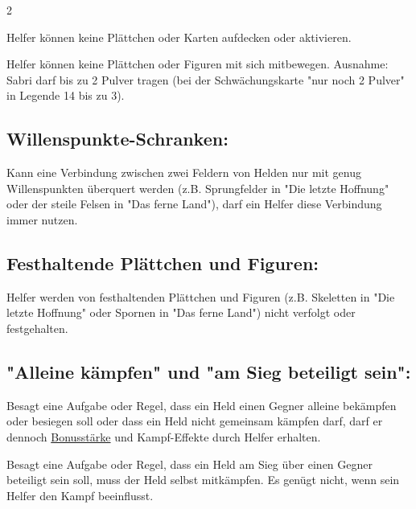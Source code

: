 \documentclass[10pt, a4paper, oneside]{book}
\begin{document}
\begin{multicols*}{2}
\begin{nobgcolor}
Helfer können keine Plättchen oder Karten aufdecken oder aktivieren.
\supercite{nh-begleitheft,dlh17-hoffnungskarte-zwerg,dh-begleitheft,mh-begleitheft}

Helfer können keine Plättchen oder Figuren mit sich mitbewegen.
\supercite{nh-begleitheft,dlh17-hoffnungskarte-zwerg,dh-begleitheft,mh-begleitheft}
Ausnahme: Sabri darf bis zu 2 Pulver tragen (bei der Schwächungskarte "nur noch 2 Pulver" in Legende 14 bis zu 3).






\subsection{Willenspunkte-Schranken:}

Kann eine Verbindung zwischen zwei Feldern von Helden nur mit genug Willenspunkten überquert werden (z.B. Sprungfelder in "Die letzte Hoffnung" oder der steile Felsen in "Das ferne Land"), darf ein Helfer diese Verbindung immer nutzen.
\supercite{dlh17-hoffnungskarte-zwerg,dh-begleitheft,94521}


\subsection{Festhaltende Plättchen und Figuren:}

Helfer werden von festhaltenden Plättchen und Figuren (z.B. Skeletten in "Die letzte Hoffnung" oder Spornen in "Das ferne Land") nicht verfolgt oder festgehalten.\supercite{dlh17-hoffnungskarte-zwerg,ag-begleitheft,mh-begleitheft}



\columnbreak

\subsection{"Alleine kämpfen" und "am Sieg beteiligt sein":}


Besagt eine Aufgabe oder Regel, dass ein Held einen Gegner alleine bekämpfen oder besiegen soll oder dass ein Held nicht gemeinsam kämpfen darf, darf er dennoch \hyperref[bonusstaerke]{Bonusstärke} und Kampf-Effekte durch Helfer erhalten.
\supercite{stsch-varkurs-triumph,5623,17369}

Besagt eine Aufgabe oder Regel, dass ein Held am Sieg über einen Gegner beteiligt sein soll, muss der Held selbst mitkämpfen. Es genügt nicht, wenn sein Helfer den Kampf beeinflusst.
\supercite{28472}










\end{nobgcolor}
\end{multicols*}
\end{document}
